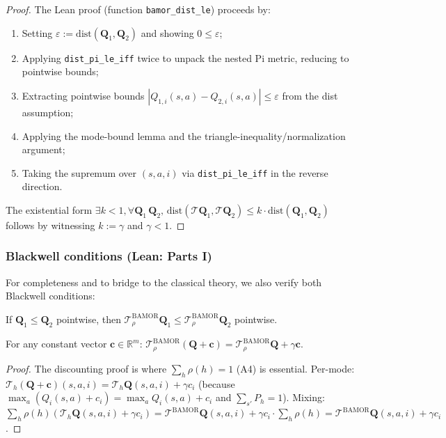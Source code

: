 \begin{proof}
The Lean proof (function \texttt{bamor\_dist\_le}) proceeds by:
\begin{enumerate}
    \item Setting $\varepsilon := \mathrm{dist}(\mathbf{Q}_1, \mathbf{Q}_2)$ and showing $0 \le \varepsilon$;
    \item Applying \texttt{dist\_pi\_le\_iff} twice to unpack the nested Pi metric, reducing to pointwise bounds;
    \item Extracting pointwise bounds $|Q_{1,i}(s,a) - Q_{2,i}(s,a)| \le \varepsilon$ from the dist assumption;
    \item Applying the mode-bound lemma and the triangle-inequality/normalization argument;
    \item Taking the supremum over $(s,a,i)$ via \texttt{dist\_pi\_le\_iff} in the reverse direction.
\end{enumerate}
The existential form $\exists k < 1, \forall \mathbf{Q}_1\,\mathbf{Q}_2,\, \mathrm{dist}(\mathcal{T}\mathbf{Q}_1, \mathcal{T}\mathbf{Q}_2) \le k \cdot \mathrm{dist}(\mathbf{Q}_1, \mathbf{Q}_2)$ follows by witnessing $k := \gamma$ and $\gamma < 1$.
\end{proof}

\subsubsection{Blackwell conditions (Lean: Parts I)}

For completeness and to bridge to the classical theory, we also verify both Blackwell conditions:

\begin{lemma}
If $\mathbf{Q}_1 \le \mathbf{Q}_2$ pointwise, then $\mathcal{T}^{\mathrm{BAMOR}}_\rho \mathbf{Q}_1 \le \mathcal{T}^{\mathrm{BAMOR}}_\rho \mathbf{Q}_2$ pointwise.
\end{lemma}

\begin{lemma}
For any constant vector $\mathbf{c} \in \mathbb{R}^m$: $\mathcal{T}^{\mathrm{BAMOR}}_\rho(\mathbf{Q} + \mathbf{c}) = \mathcal{T}^{\mathrm{BAMOR}}_\rho \mathbf{Q} + \gamma \mathbf{c}$.
\end{lemma}

\begin{proof}
The discounting proof is where $\sum_h \rho(h) = 1$ (A4) is essential.  Per-mode: $\mathcal{T}_h(\mathbf{Q} + \mathbf{c})(s,a,i) = \mathcal{T}_h\mathbf{Q}(s,a,i) + \gamma c_i$ (because $\max_a (Q_i(s,a) + c_i) = \max_a Q_i(s,a) + c_i$ and $\sum_{s'} P_h = 1$).  Mixing: $\sum_h \rho(h)(\mathcal{T}_h\mathbf{Q}(s,a,i) + \gamma c_i) = \mathcal{T}^{\mathrm{BAMOR}}\mathbf{Q}(s,a,i) + \gamma c_i \cdot \sum_h \rho(h) = \mathcal{T}^{\mathrm{BAMOR}}\mathbf{Q}(s,a,i) + \gamma c_i$.
\end{proof}

